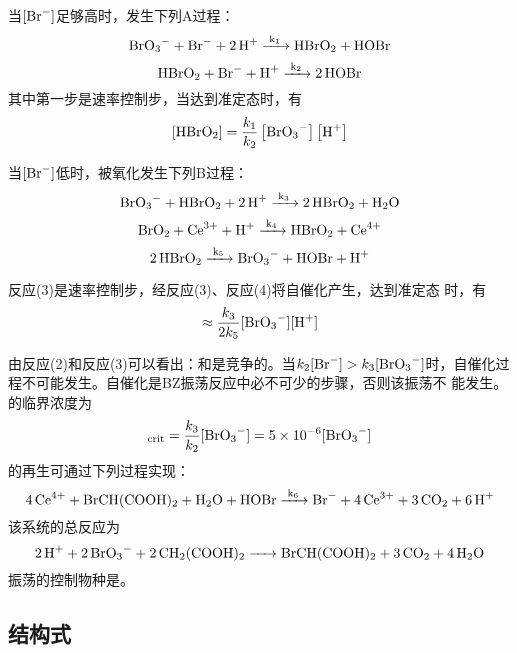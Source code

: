 当$[\ce{Br-}]$足够高时，发生下列A过程：
\begin{equation}
    \ce{BrO3- + Br- + 2H+ ->[k_1] HBrO2 +HOBr}
\end{equation}
\begin{equation}
    \ce{HBrO2 + Br- + H+ ->[k_2] 2HOBr}
\end{equation}
其中第一步是速率控制步，当达到准定态时，有
\begin{equation*}
    \left[\ce{HBrO2}\right] =\frac{k_1}{k_2}\left[\ce{BrO3-}\right]\left[\ce{H+}\right]
\end{equation*}

当$[\ce{Br-}]$低时，被氧化发生下列B过程：
\begin{equation}
    \ce{BrO3- + HBrO2 + 2H+ ->[k_3] 2HBrO2 + H2O}
\end{equation}
\begin{equation}
    \ce{BrO2 + Ce^{3+} + H+ ->[k_4] HBrO2 + Ce^{4+}}
\end{equation}
\begin{equation}
    \ce{2HBrO2 ->[k_5] BrO3- + HOBr + H+}
\end{equation}

反应(3)是速率控制步，经反应(3)、反应(4)将自催化产生，达到准定态
时，有
\begin{equation*}
    [\ce{HBrO2}] \approx \frac{k_3}{2k_5}[\ce{BrO3-}][\ce{H+}]
\end{equation*}

由反应(2)和反应(3)可以看出：和是竞争的。当$k_2[\ce{Br-}]>k_3[\ce{BrO3-}]$时，自催化过程不可能发生。自催化是BZ振荡反应中必不可少的步骤，否则该振荡不
能发生。的临界浓度为
\begin{equation*}
    [\ce{Br-}]_\text{crit} =\frac{k_3}{k_2}[\ce{BrO3-}] =\num{5e-6}[\ce{BrO3-}]
\end{equation*}
的再生可通过下列过程实现：
\begin{equation}
    \ce{4Ce^{4+} + BrCH(COOH)2 +H2O + HOBr ->[k_6] Br- + 4Ce^{3+} + 3CO2 + 6H+}
\end{equation}
该系统的总反应为
\begin{equation}
    \ce{2H+ + 2BrO3- + 2CH2(COOH)2 ->  BrCH(COOH)2 + 3CO2 + 4H2O}
\end{equation}
振荡的控制物种是\cite{qiujinhengetal2010}。


\subsection{结构式}

